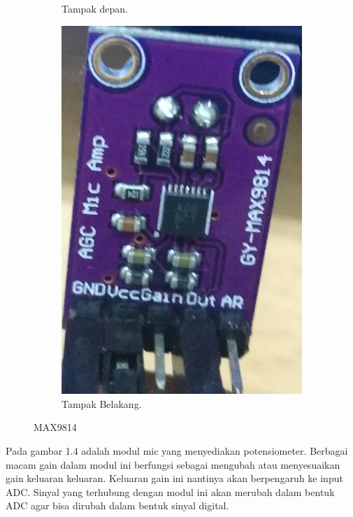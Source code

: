 \documentclass[11pt]{article}
\numberwithin{equation}{subsection}
\begin{document}
\begin{figure}[h!]
\begin{subfigure}[b]{0.39\linewidth}
		\caption{Tampak depan.}
	\end{subfigure}
	\begin{subfigure}[b]{0.4\linewidth}
		\includegraphics[width=\linewidth]{dokumentasi/MIC/2.jpg}
		\caption{Tampak Belakang.}
	\end{subfigure}
	\caption{MAX9814}
	\label{fig:MAX9814}
\end{figure}
Pada gambar 1.4 adalah modul mic yang menyediakan potensiometer.
Berbagai macam gain dalam modul ini berfungsi sebagai mengubah atau menyesuaikan gain keluaran keluaran.
Keluaran gain ini nantinya akan berpengaruh ke input ADC.
Sinyal yang terhubung dengan modul ini akan merubah dalam bentuk ADC agar bisa dirubah dalam bentuk sinyal digital.
\end{document}
